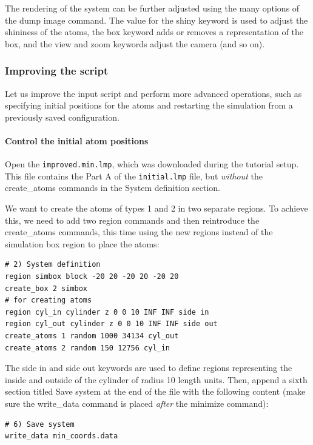 \documentclass[9pt,tutorial]{livecoms}
\newcommand{\lmpcmd}[1]{\hspace{0pt}\colorbox{listing}{\textcolor{command}{\small{#1}}}\hspace{0pt}} %
\newcommand{\flecmd}[1]{\textcolor{command}{\texttt{#1}}} %
\begin{document}
The rendering of the system can be further adjusted using the many
options of the \lmpcmd{dump image} command.  The value for the
\lmpcmd{shiny} keyword is used to adjust the shininess of the atoms, the
\lmpcmd{box} keyword adds or removes a representation of the box, and
the \lmpcmd{view} and \lmpcmd{zoom} keywords adjust the camera (and so
on).

\subsubsection{Improving the script}

Let us improve the input script and perform more advanced operations,
such as specifying initial positions for the atoms and restarting the
simulation from a previously saved configuration.

\paragraph{Control the initial atom positions}

Open the \flecmd{improved.min.lmp}, which was downloaded during the
tutorial setup.  This file contains the \lmpcmd{Part A} of the
\flecmd{initial.lmp} file, but \emph{without} the \lmpcmd{create\_atoms}
commands in the \lmpcmd{System definition} section.

We want to create the atoms of types 1 and 2 in two separate
regions.  To achieve this, we need to add two \lmpcmd{region} commands and then
reintroduce the \lmpcmd{create\_atoms} commands, this time using the new
regions instead of the simulation box region to place the atoms:
\begin{lstlisting}
# 2) System definition
region simbox block -20 20 -20 20 -20 20
create_box 2 simbox
# for creating atoms
region cyl_in cylinder z 0 0 10 INF INF side in
region cyl_out cylinder z 0 0 10 INF INF side out
create_atoms 1 random 1000 34134 cyl_out
create_atoms 2 random 150 12756 cyl_in
\end{lstlisting}
The \lmpcmd{side in} and \lmpcmd{side out} keywords are used to define
regions representing the inside and outside of the cylinder of radius
10 length units.  Then, append a sixth section titled \lmpcmd{Save system} at the end
of the file with the following content (make sure the \lmpcmd{write\_data} command
is placed \emph{after} the \lmpcmd{minimize} command):
\begin{lstlisting}
# 6) Save system
write_data min_coords.data
\end{lstlisting}
\end{document}
